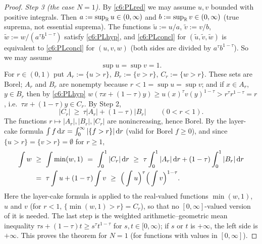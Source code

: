 \begin{proof}
\emph{Step 3 (the case $N=1$).}
By \eqref{c6:PLred} we may assume $u,v$ bounded with positive integrals. Then $a:=\sup_{\mathbb{R}} u\in(0,\infty)$ and $b:=\sup_{\mathbb{R}} v\in(0,\infty)$ (true suprema, not essential suprema).
The functions $\tilde u:=u/a$, $\tilde v:=v/b$, $\tilde w:=w/(a^\tau b^{1-\tau})$ satisfy \eqref{c6:PLhyp}, and \eqref{c6:PLconcl} for $(\tilde u,\tilde v,\tilde w)$ is equivalent to \eqref{c6:PLconcl} for $(u,v,w)$ (both sides are divided by $a^\tau b^{1-\tau}$). So we may assume
\[\sup u=\sup v=1 .\]
For $r\in(0,1)$ put $A_r:=\{u>r\}$, $B_r:=\{v>r\}$, $C_r:=\{w>r\}$. These sets are Borel; $A_r$ and $B_r$ are nonempty because $r<1=\sup u=\sup v$; and if $x\in A_r$, $y\in B_r$ then by \eqref{c6:PLhyp}
$w(\tau x+(1-\tau)y)\ge u(x)^\tau v(y)^{1-\tau}>r^\tau r^{1-\tau}=r$, i.e.\ $\tau x+(1-\tau)y\in C_r$.
By Step 2,
\begin{equation}\label{c6:PLlevel}
|C_r|\ \ge\ \tau|A_r|+(1-\tau)|B_r|\qquad(0<r<1).
\end{equation}
The functions $r\mapsto|A_r|,|B_r|,|C_r|$ are nonincreasing, hence Borel. By the layer-cake formula $\int f\,\mathrm{d} x=\int_0^\infty|\{f>r\}|\,\mathrm{d} r$ (valid for Borel $f\ge0$), and since $\{u>r\}=\{v>r\}=\emptyset$ for $r\ge1$,
\begin{align*}\int w\ &\ge\ \int\min(w,1)\ =\ \int_0^1|C_r|\,\rd r\ \ge\ \tau\int_0^1|A_r|\,\rd r+(1-\tau)\int_0^1|B_r|\,\rd r\\
&=\ \tau\int u+(1-\tau)\int v\ \ge\ \Big(\int u\Big)^\tau\Big(\int v\Big)^{1-\tau}.\end{align*}
Here the layer-cake formula is applied to the real-valued functions $\min(w,1)$, $u$ and $v$ (for $r<1$, $\{\min(w,1)>r\}=C_r$), so that no $[0,\infty]$-valued version of it is needed.
The last step is the weighted arithmetic--geometric mean inequality $\tau s+(1-\tau)t\ge s^\tau t^{1-\tau}$ for $s,t\in[0,\infty)$; if $s$ or $t$ is $+\infty$, the left side is $+\infty$.
This proves the theorem for $N=1$ (for functions with values in $[0,\infty]$).


\end{proof}
